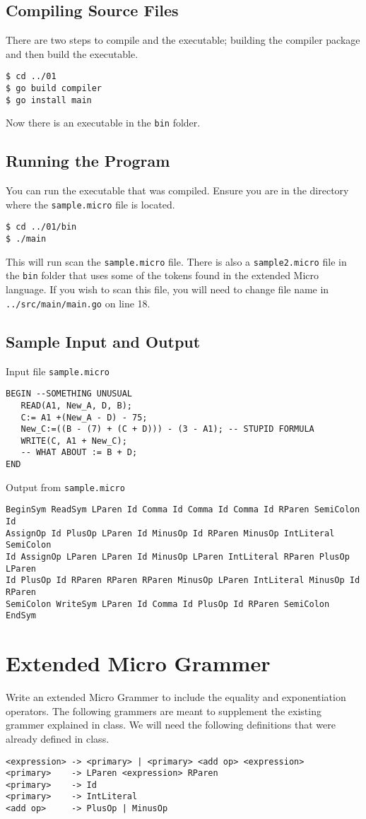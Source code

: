 \documentclass[11pt]{article}
\begin{document}
\subsection{Compiling Source Files}
\label{sec-1-3}
There are two steps to compile and the executable; building the compiler
package and then build the executable.
\begin{verbatim}
$ cd ../01
$ go build compiler
$ go install main
\end{verbatim}
Now there is an executable in the \texttt{bin} folder.

\subsection{Running the Program}
\label{sec-1-4}
You can run the executable that was compiled. Ensure you are in the 
directory where the \texttt{sample.micro} file is located.
\begin{verbatim}
$ cd ../01/bin
$ ./main
\end{verbatim}

This will run scan the \texttt{sample.micro} file. There is also a \texttt{sample2.micro}
file in the \texttt{bin} folder that uses some of the tokens found in the 
extended Micro language. If you wish to scan this file, you will need to
change file name in \texttt{../src/main/main.go} on line 18.

\subsection{Sample Input and Output}
\label{sec-1-5}
Input file \texttt{sample.micro}
\begin{verbatim}
BEGIN --SOMETHING UNUSUAL
   READ(A1, New_A, D, B);
   C:= A1 +(New_A - D) - 75;
   New_C:=((B - (7) + (C + D))) - (3 - A1); -- STUPID FORMULA
   WRITE(C, A1 + New_C);
   -- WHAT ABOUT := B + D;
END
\end{verbatim}
Output from \texttt{sample.micro}
\begin{verbatim}
BeginSym ReadSym LParen Id Comma Id Comma Id Comma Id RParen SemiColon Id 
AssignOp Id PlusOp LParen Id MinusOp Id RParen MinusOp IntLiteral SemiColon
Id AssignOp LParen LParen Id MinusOp LParen IntLiteral RParen PlusOp LParen
Id PlusOp Id RParen RParen RParen MinusOp LParen IntLiteral MinusOp Id RParen
SemiColon WriteSym LParen Id Comma Id PlusOp Id RParen SemiColon EndSym
\end{verbatim}

\section{Extended Micro Grammer}
\label{sec-2}
Write an extended Micro Grammer to include the equality and exponentiation
operators. The following grammers are meant to supplement the existing 
grammer explained in class.\newline
We will need the following definitions that were already defined in class.
\begin{verbatim}
<expression> -> <primary> | <primary> <add op> <expression>
<primary>    -> LParen <expression> RParen
<primary>    -> Id
<primary>    -> IntLiteral
<add op>     -> PlusOp | MinusOp
\end{verbatim}
\end{document}
